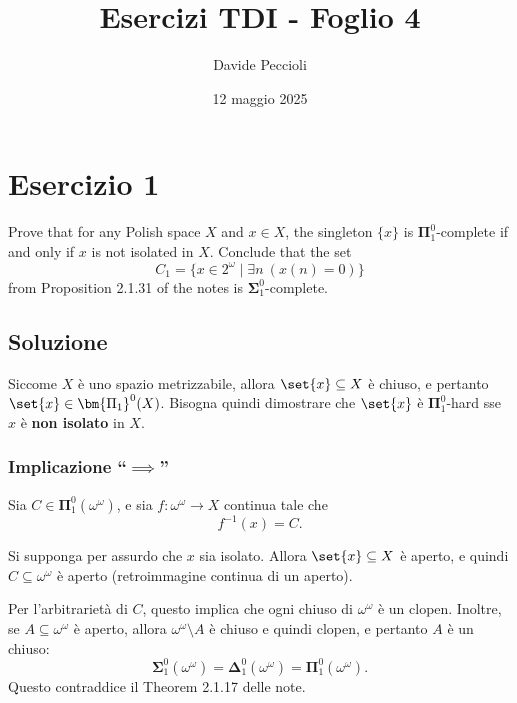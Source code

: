 \documentclass{article}
\author{Davide Peccioli}
\date{12 maggio 2025}
\title{Esercizi TDI - Foglio 4}
\newcommand{\1}{\mathds{1}}
\renewcommand{\href}[2]{#2}
\begin{document}
\maketitle
\section{Esercizio 1}
\label{sec:orga85bf6d}

Prove that for any \href{../../../../../../org/roam/20250301194013-spazio_polacco.org}{Polish space} \(X\) and \(x \in X\), the singleton \(\{x\}\) is \(\bm{\Pi}^0_1\)-complete if and only if \(x\) is not \href{../../../../../../org/roam/20250403131856-punto_isolato.org}{isolated} in \(X\). Conclude that the set
\[
  C_1 = \{x \in 2^\omega \mid \exists n \ (x(n) = 0)\}
\]
from Proposition 2.1.31 of the notes is \(\bm{\Sigma}^0_1\)-complete.
\subsection{Soluzione}
\label{sec:org0c1a504}

Siccome \(X\) è uno spazio metrizzabile, allora \(\set{x} \subseteq X\) è chiuso, e pertanto \(\set{x} \in \bm{\Pi_{1}}^{0}(X)\). Bisogna quindi dimostrare che \(\set{x}\) è \(\bm{\Pi}^{0}_{1}\)-hard sse \(x\) è \textbf{non isolato} in \(X\).
\subsubsection{Implicazione ``\(\implies\)''}
\label{sec:org02a916b}

Sia \(C \in \bm{\Pi}_{1}^{0}(\omega^{\omega})\), e sia \(f: \omega^{\omega}\to X\) continua tale che
\begin{equation*}
f^{-1}(x) = C.
\end{equation*}

Si supponga per assurdo che \(x\) sia isolato. Allora \(\set{x} \subseteq X\) è aperto, e quindi \(C \subseteq \omega^{\omega}\) è aperto (retroimmagine continua di un aperto).

Per l'arbitrarietà di \(C\), questo implica che ogni chiuso di \(\omega^{\omega}\) è un clopen. Inoltre, se \(A \subseteq \omega^{\omega}\) è aperto, allora \(\omega^{\omega}\setminus A\) è chiuso e quindi clopen, e pertanto \(A\) è un chiuso:
\begin{equation*}
\bm{\Sigma}_{1}^{0}(\omega^{\omega}) = \bm{\Delta}_{1}^{0}(\omega^{\omega}) = \bm{\Pi}_{1}^{0}(\omega^{\omega}).
\end{equation*}
Questo contraddice il Theorem 2.1.17 delle note.
\end{document}
